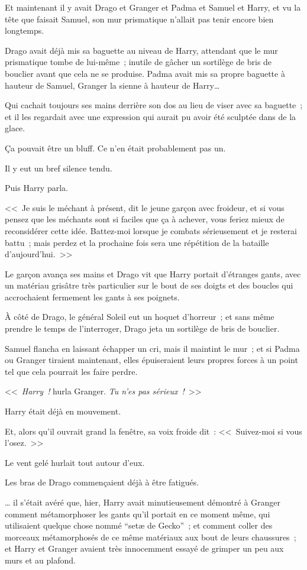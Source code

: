 Et maintenant il y avait Drago et Granger et Padma et Samuel et Harry, et vu la tête que faisait Samuel, son mur prismatique n'allait pas tenir encore bien longtemps.

Drago avait déjà mis sa baguette au niveau de Harry, attendant que le mur prismatique tombe de lui-même~; inutile de gâcher un sortilège de bris de bouclier avant que cela ne se produise. Padma avait mis sa propre baguette à hauteur de Samuel, Granger la sienne à hauteur de Harry…

Qui cachait toujours ses mains derrière son dos au lieu de viser avec sa baguette~; et il les regardait avec une expression qui aurait pu avoir été sculptée dans de la glace.

Ça pouvait être un bluff. Ce n'en était probablement pas un.

Il y eut un bref silence tendu.

Puis Harry parla.

<<~Je suis le méchant à présent, dit le jeune garçon avec froideur, et si vous pensez que les méchants sont si faciles que ça à achever, vous feriez mieux de reconsidérer cette idée. Battez-moi lorsque je combats sérieusement et je resterai battu~; mais perdez et la prochaine fois sera une répétition de la bataille d'aujourd'hui.~>>

Le garçon avança ses mains et Drago vit que Harry portait d'étranges gants, avec un matériau grisâtre très particulier sur le bout de ses doigts et des boucles qui accrochaient fermement les gants à ses poignets.

À côté de Drago, le général Soleil eut un hoquet d'horreur~; et sans même prendre le temps de l'interroger, Drago jeta un sortilège de bris de bouclier.

Samuel flancha en laissant échapper un cri, mais il maintint le mur~; et si Padma ou Granger tiraient maintenant, elles épuiseraient leurs propres forces à un point tel que cela pourrait les faire perdre.

<<~\emph{Harry~!} hurla Granger. \emph{Tu n'es pas sérieux~!}~>>

Harry était déjà en mouvement.

Et, alors qu'il ouvrait grand la fenêtre, sa voix froide dit~: <<~Suivez-moi si vous l'osez.~>>

\later

Le vent gelé hurlait tout autour d'eux.

Les bras de Drago commençaient déjà à être fatigués.

… il s'était avéré que, hier, Harry avait minutieusement démontré à Granger comment métamorphoser les gants qu'il portait en ce moment même, qui utilisaient quelque chose nommé “setæ de Gecko”~; et comment coller des morceaux métamorphosés de ce même matériaux aux bout de leurs chaussures~; et Harry et Granger avaient très innocemment essayé de grimper un peu aux murs et au plafond.

